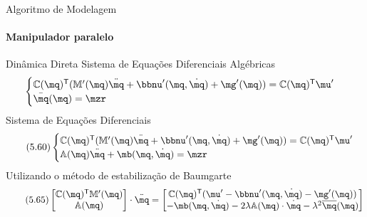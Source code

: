 \documentclass[25pt,landscape]{beamer}
\begin{document}
\begin{frame}{Algoritmo de Modelagem}
    \framesubtitle{Manipulador paralelo}
    \begin{block}{Dinâmica Direta}
    	Sistema de Equações Diferenciais Algébricas
    	\begin{equation*}
			\begin{cases}
			\mC(\mq)^\msT (   \mM'(\mq)\ddot{\mq} + \mnu'(\mq,\dot{\mq}) + \mg'(\mq) ) = \mC(\mq)^\msT \mu' \\
			\bar{\mq}(\mq) = \mzr
			\end{cases}
		\end{equation*}
		Sistema de Equações Diferenciais
    	\begin{equation} \tag{5.60}
			\begin{cases}
			\mC(\mq)^\msT (   \mM'(\mq)\ddot{\mq} + \mnu'(\mq,\dot{\mq}) + \mg'(\mq) ) = \mC(\mq)^\msT \mu' \\
			\mA(\mq)\ddot{\mq} + \mb(\mq,\dot{\mq}) = \mzr
			\end{cases}
		\end{equation}
		Utilizando o método de estabilização de Baumgarte
		\begin{equation} \tag{5.65}
			\begin{bmatrix}
				\mC(\mq)^\msT \mM'(\mq) \\
				\mA(\mq)
			\end{bmatrix}
			\cdot
			\ddot{\mq}
			=
			\begin{bmatrix}
				\mC(\mq)^\msT (\mu' - \mnu'(\mq,\dot{\mq}) - \mg'(\mq) ) \\
				-\mb(\mq,\dot{\mq}) -
				2\lambda
				\mA(\mq) \cdot \dot{\mq} -
				\lambda^2
				\overline{\mq}(\mq) \\
			\end{bmatrix}
		\end{equation}
    \end{block}
\end{frame}
\end{document}
